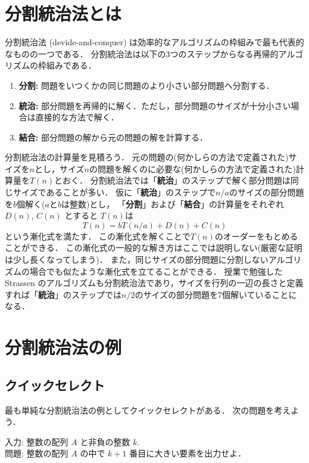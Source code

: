 \documentclass[a4paper,twoside,onecolumn,openany,article]{memoir}
\theoremstyle{remark}
\begin{document}
\section{分割統治法とは}
分割統治法 (devide-and-conquer) は効率的なアルゴリズムの枠組みで最も代表的なものの一つである．
分割統治法は以下の3つのステップからなる再帰的アルゴリズムの枠組みである．
\begin{enumerate}
\item \textbf{分割:} 問題をいつくかの同じ問題のより小さい部分問題へ分割する．
\item \textbf{統治:} 部分問題を再帰的に解く．ただし，部分問題のサイズが十分小さい場合は直接的な方法で解く．
\item \textbf{結合:} 部分問題の解から元の問題の解を計算する．
\end{enumerate}
分割統治法の計算量を見積ろう．
元の問題の(何かしらの方法で定義された)サイズを$n$とし，サイズ$n$の問題を解くのに必要な(何かしらの方法で定義された)計算量を$T(n)$とおく．
分割統治法では「\textbf{統治}」のステップで解く部分問題は同じサイズであることが多い．
仮に「\textbf{統治}」のステップで$n/a$のサイズの部分問題を$b$個解く($a$と$b$は整数)とし，
「\textbf{分割}」および「\textbf{結合}」の計算量をそれぞれ$D(n)$, $C(n)$ とすると
$T(n)$は
\begin{equation*}
T(n) = bT(n/a) + D(n) + C(n)
\end{equation*}
という漸化式を満たす．
この漸化式を解くことで$T(n)$のオーダーをもとめることができる．
この漸化式の一般的な解き方はここでは説明しない(厳密な証明は少し長くなってしまう)．
また，同じサイズの部分問題に分割しないアルゴリズムの場合でも似たような漸化式を立てることができる．
%
授業で勉強した Strassen のアルゴリズムも分割統治法であり，サイズを行列の一辺の長さと定義すれば「\textbf{統治}」のステップでは$n/2$のサイズの部分問題を7個解いていることになる．


\section{分割統治法の例}
\subsection{クイックセレクト}
最も単純な分割統治法の例としてクイックセレクトがある．
次の問題を考えよう．

\vspace{1em}
\noindent
入力: 整数の配列 $A$ と非負の整数 $k$.\\
問題: 整数の配列 $A$ の中で $k+1$ 番目に大きい要素を出力せよ．
\end{document}
